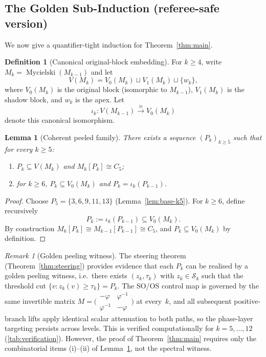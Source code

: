\documentclass[11pt,a4paper]{amsart}
\theoremstyle{plain}
\newtheorem{lemma}[theorem]{Lemma}
\theoremstyle{definition}
\newtheorem{definition}[theorem]{Definition}
\theoremstyle{remark}
\newtheorem{remark}[theorem]{Remark}
\newcommand{\vp}{\varphi}
\newcommand{\myc}{\operatorname{Mycielski}}
\begin{document}
\subsection{The Golden Sub-Induction (referee-safe version)}\label{ssec:sub-induction}

We now give a quantifier-tight induction for Theorem~\ref{thm:main}.

\begin{definition}[Canonical original-block embedding]
For $k\ge 4$, write $M_k=\myc(M_{k-1})$ and let
\[
V(M_k)=V_0(M_k)\sqcup V_1(M_k)\sqcup\{w_k\},
\]
where $V_0(M_k)$ is the original block (isomorphic to $M_{k-1}$),
$V_1(M_k)$ is the shadow block, and $w_k$ is the apex.
Let
\[
\iota_k:V(M_{k-1})\xrightarrow{\cong}V_0(M_k)
\]
denote this canonical isomorphism.
\end{definition}

\begin{lemma}[Coherent peeled family]\label{lem:coherent-family}
There exists a sequence $(P_k)_{k\ge 5}$ such that for every $k\ge 5$:
\begin{enumerate}[\upshape(i)]
\item $P_k\subseteq V(M_k)$ and $M_k[P_k]\cong C_5$;
\item for $k\ge 6$, $P_k\subseteq V_0(M_k)$ and
      $P_k=\iota_k(P_{k-1})$.
\end{enumerate}
\end{lemma}

\begin{proof}
Choose $P_5 = \{3,6,9,11,13\}$ (Lemma~\ref{lem:base-k5}). For $k\ge 6$,
define recursively
\[
P_k:=\iota_k(P_{k-1})\subseteq V_0(M_k).
\]
By construction $M_k[P_k]\cong M_{k-1}[P_{k-1}]\cong C_5$, and
$P_k \subseteq V_0(M_k)$ by definition.
\end{proof}

\begin{remark}[Golden peeling witness]\label{rem:golden-witness}
The steering theorem (Theorem~\ref{thm:steering}) provides evidence that each
$P_k$ can be realised by a golden peeling witness, i.e.\ there exists
$(z_k,\tau_k)$ with $z_k \in \mathcal{S}_k$ such that the threshold cut
$\{v : z_k(v) \geq \tau_k\} = P_k$.  The SO/OS control map is governed by
the same invertible matrix
$M = \bigl(\begin{smallmatrix}-\vp&\vp^{-1}\\ \vp^{-1}&-\vp\end{smallmatrix}\bigr)$
at every~$k$, and all subsequent positive-branch lifts apply identical scalar
attenuation to both paths, so the phase-layer targeting persists across levels.
This is verified computationally for $k = 5,\ldots,12$
(\cref{tab:verification}).  However, the proof of Theorem~\ref{thm:main}
requires only the combinatorial items (i)--(ii) of
Lemma~\ref{lem:coherent-family}, not the spectral witness.
\end{remark}
\end{document}

